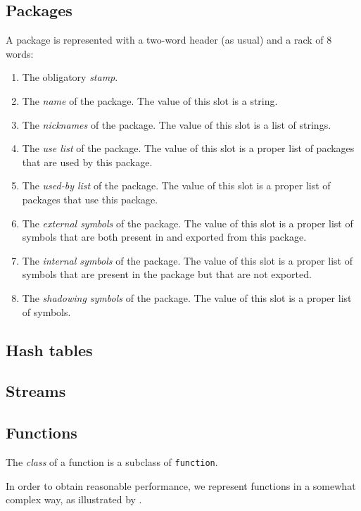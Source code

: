 \subsection{Packages}

A package is represented with a two-word header (as usual) and a
rack of 8 words:

\begin{enumerate}
\item The obligatory \emph{stamp}.
\item The \emph{name} of the package.  The value of this slot is a
  string.
\item The \emph{nicknames} of the package.  The value of this slot is
  a list of strings.
\item The \emph{use list} of the package.  The value of this slot is a
  proper list of packages that are used by this package.
\item The \emph{used-by list} of the package.  The value of this slot
is a proper list of packages that use this package.
\item The \emph{external symbols} of the package.  The value of this
  slot is a proper list of symbols that are both present in and
  exported from this package.
\item The \emph{internal symbols} of the package.  The value of this
  slot is a proper list of symbols that are present in the package but
  that are not exported.
\item The \emph{shadowing symbols} of the package.  The value of this
  slot is a proper list of symbols.
\end{enumerate}

\subsection{Hash tables}

\subsection{Streams}

\subsection{Functions}
\label{sec-data-representation-functions}

The \emph{class} of a function is a subclass of \texttt{function}.

In order to obtain reasonable performance, we represent functions in a
somewhat complex way, as illustrated by
.

